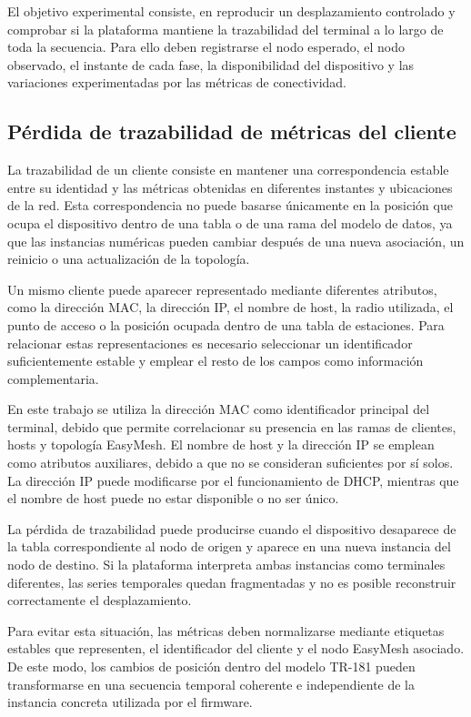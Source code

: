 El objetivo experimental consiste, 
en reproducir un desplazamiento controlado y comprobar 
si la plataforma mantiene la trazabilidad del terminal a lo largo de toda la secuencia. 
Para ello deben registrarse el nodo esperado, el nodo observado, 
el instante de cada fase, la disponibilidad del dispositivo 
y las variaciones experimentadas por las métricas de conectividad.

\subsection{Pérdida de trazabilidad de métricas del cliente}
\label{subsec:perdida-trazabilidad}

La trazabilidad de un cliente consiste en mantener una correspondencia 
estable entre su identidad y las métricas obtenidas en diferentes instantes 
y ubicaciones de la red. 
Esta correspondencia no puede basarse únicamente en la posición 
que ocupa el dispositivo dentro de una tabla o de una rama del modelo de datos, 
ya que las instancias numéricas pueden cambiar después de una nueva asociación,
un reinicio o una actualización de la topología.

Un mismo cliente puede aparecer representado mediante diferentes atributos, 
como la dirección MAC, la dirección IP, el nombre de host, la radio utilizada, 
el punto de acceso o la posición ocupada dentro de una tabla de estaciones. 
Para relacionar estas representaciones es necesario seleccionar un identificador 
suficientemente estable y emplear el resto de los campos como información complementaria.

En este trabajo se utiliza la dirección MAC como identificador principal del terminal, 
debido que permite correlacionar su presencia en las ramas de clientes, 
hosts y topología EasyMesh. 
El nombre de host y la dirección IP se emplean como atributos auxiliares, 
debido a que no se consideran suficientes por sí solos. 
La dirección IP puede modificarse por el funcionamiento de DHCP, 
mientras que el nombre de host puede no estar disponible o no ser único.

La pérdida de trazabilidad puede producirse cuando el dispositivo
desaparece de la tabla correspondiente al nodo de origen y
aparece en una nueva instancia del nodo de destino. 
Si la plataforma interpreta ambas instancias como terminales diferentes, 
las series temporales quedan fragmentadas y 
no es posible reconstruir correctamente el desplazamiento.

Para evitar esta situación,
las métricas deben normalizarse mediante etiquetas estables que representen, 
el identificador del cliente y el nodo EasyMesh asociado. 
De este modo, los cambios de posición dentro del modelo TR-181 
pueden transformarse en una secuencia temporal coherente e independiente 
de la instancia concreta utilizada por el firmware.

